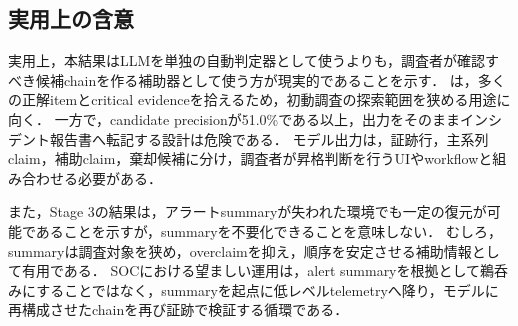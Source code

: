 \subsection{実用上の含意}

実用上，本結果はLLMを単独の自動判定器として使うよりも，調査者が確認すべき候補chainを作る補助器として使う方が現実的であることを示す．
は，多くの正解itemとcritical evidenceを拾えるため，初動調査の探索範囲を狭める用途に向く．
一方で，candidate precisionが51.0\%である以上，出力をそのままインシデント報告書へ転記する設計は危険である．
モデル出力は，証跡行，主系列claim，補助claim，棄却候補に分け，調査者が昇格判断を行うUIやworkflowと組み合わせる必要がある．

また，Stage 3の結果は，アラートsummaryが失われた環境でも一定の復元が可能であることを示すが，summaryを不要化できることを意味しない．
むしろ，summaryは調査対象を狭め，overclaimを抑え，順序を安定させる補助情報として有用である．
SOCにおける望ましい運用は，alert summaryを根拠として鵜呑みにすることではなく，summaryを起点に低レベルtelemetryへ降り，モデルに再構成させたchainを再び証跡で検証する循環である．


